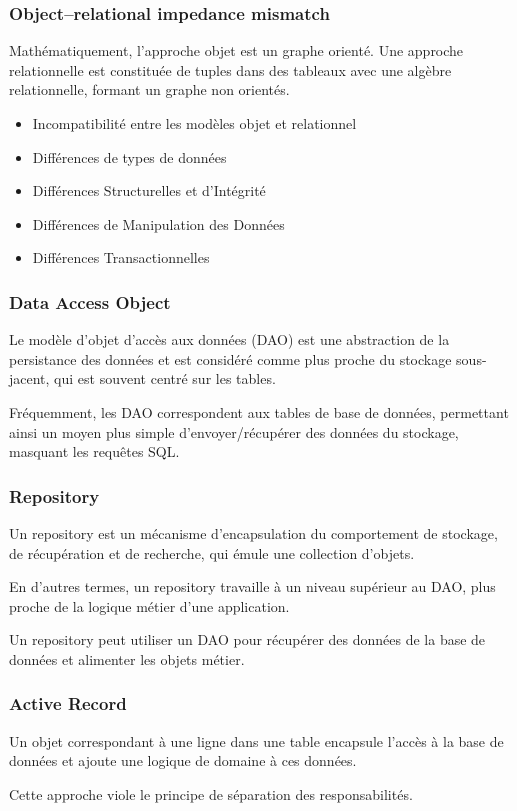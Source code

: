 \begin{frame}
    \frametitle{Object–relational impedance mismatch}

    Mathématiquement, l'approche objet est un graphe orienté.
    Une approche relationnelle est constituée de tuples dans des tableaux avec une algèbre relationnelle,
    formant un graphe non orientés.

    \begin{itemize}
        \item Incompatibilité entre les modèles objet et relationnel
        \item Différences de types de données
        \item Différences Structurelles et d'Intégrité
        \item Différences de Manipulation des Données
        \item Différences Transactionnelles
    \end{itemize}
\end{frame}

\begin{frame}
    \frametitle{Data Access Object}
    Le modèle d'objet d'accès aux données (DAO) est une abstraction de la persistance des données
    et est considéré comme plus proche du stockage sous-jacent,
    qui est souvent centré sur les tables.

    Fréquemment,
    les DAO correspondent aux tables de base de données,
    permettant ainsi un moyen plus simple d'envoyer/récupérer des données du stockage,
    masquant les requêtes SQL.
\end{frame}

\begin{frame}
    \frametitle{Repository}

    Un repository est un mécanisme d'encapsulation du comportement de stockage,
    de récupération et de recherche,
    qui émule une collection d'objets.

    En d’autres termes, un repository travaille à un niveau supérieur au DAO,
    plus proche de la logique métier d’une application.

    Un repository peut utiliser un DAO pour récupérer des données de la base de données
    et alimenter les objets métier.
\end{frame}

\begin{frame}
    \frametitle{Active Record}

    Un objet correspondant à une ligne dans une table encapsule
    l'accès à la base de données et ajoute une logique de domaine à ces données.

    Cette approche viole le principe de séparation des responsabilités.
\end{frame}
